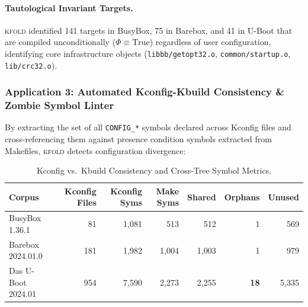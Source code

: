 \documentclass[acmsmall,screen,review]{acmart}
\newcommand{\tool}{\textsc{kfold}\xspace}
\begin{document}
\paragraph{Tautological Invariant Targets.}
\tool identified 141 targets in BusyBox, 75 in Barebox, and 41 in U-Boot that are compiled unconditionally ($\Phi \equiv \text{True}$) regardless of user configuration, identifying core infrastructure objects (\texttt{libbb/getopt32.o}, \texttt{common/startup.o}, \texttt{lib/crc32.o}).

\subsubsection{Application 3: Automated Kconfig-Kbuild Consistency \& Zombie Symbol Linter}
By extracting the set of all \texttt{CONFIG\_*} symbols declared across Kconfig files and cross-referencing them against presence condition symbols extracted from Makefiles, \tool detects configuration divergence:

\begin{table}[t]
\centering
\footnotesize
\setlength{\tabcolsep}{4pt}
\caption{Kconfig vs.\ Kbuild Consistency and Cross-Tree Symbol Metrics.}
\label{tab:kconfig-metrics}
\begin{tabular}{lrrrrrr}
\toprule
\textbf{Corpus} & \textbf{Kconfig Files} & \textbf{Kconfig Syms} & \textbf{Make Syms} & \textbf{Shared} & \textbf{Orphans} & \textbf{Unused} \\
\midrule
BusyBox 1.36.1 & 81 & 1,081 & 513 & 512 & 1 & 569 \\
Barebox 2024.01.0 & 181 & 1,982 & 1,004 & 1,003 & 1 & 979 \\
Das U-Boot 2024.01 & 954 & 7,590 & 2,273 & 2,255 & \textbf{18} & 5,335 \\
\bottomrule
\end{tabular}
\end{table}
\end{document}
